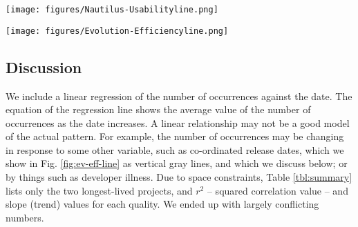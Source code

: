 \documentclass[conference, compsoc]{IEEEtran}
\begin{document}
\begin{figure*}[ht]
\begin{minipage}[]{0.5\textwidth}
\centering
\texttt{[image: figures/Nautilus-Usabilityline.png]} 
\label{fig:naut-usa-line}
\caption{Product: Nautilus, Quality: Usability}
\end{minipage}%
\hspace{0.2cm}
\begin{minipage}[]{0.5\textwidth}
\centering
\texttt{[image: figures/Evolution-Efficiencyline.png]}
\label{fig:ev-eff-line}
\caption{Product: Evolution, Quality: Efficiency}
\end{minipage}
\end{figure*}

\vspace{-2mm}
\subsection{Discussion}
\vspace{-2mm}

We include a linear regression of the number of occurrences against the date. The equation of the regression line shows the average value of the number of occurrences as the date increases. A linear relationship may not be a good model of the actual pattern. For example, the number of occurrences may be changing in response to some other variable, such as co-ordinated release dates, which we show in Fig. \ref{fig:ev-eff-line} as vertical gray lines, and which we discuss below; or by things such as developer illness. Due to space constraints, Table \ref{tbl:summary} lists only the two longest-lived projects, and $r^2$  -- squared correlation value -- and slope (trend) values for each quality. We ended up with largely conflicting numbers. 
\end{document}
